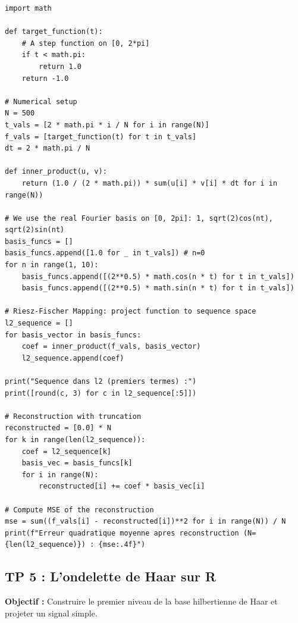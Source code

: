 \documentclass[11pt,a4paper]{article}
\begin{document}
\begin{lstlisting}
import math

def target_function(t):
    # A step function on [0, 2*pi]
    if t < math.pi:
        return 1.0
    return -1.0

# Numerical setup
N = 500
t_vals = [2 * math.pi * i / N for i in range(N)]
f_vals = [target_function(t) for t in t_vals]
dt = 2 * math.pi / N

def inner_product(u, v):
    return (1.0 / (2 * math.pi)) * sum(u[i] * v[i] * dt for i in range(N))

# We use the real Fourier basis on [0, 2pi]: 1, sqrt(2)cos(nt), sqrt(2)sin(nt)
basis_funcs = []
basis_funcs.append([1.0 for _ in t_vals]) # n=0
for n in range(1, 10):
    basis_funcs.append([(2**0.5) * math.cos(n * t) for t in t_vals])
    basis_funcs.append([(2**0.5) * math.sin(n * t) for t in t_vals])

# Riesz-Fischer Mapping: project function to sequence space
l2_sequence = []
for basis_vector in basis_funcs:
    coef = inner_product(f_vals, basis_vector)
    l2_sequence.append(coef)

print("Sequence dans l2 (premiers termes) :")
print([round(c, 3) for c in l2_sequence[:5]])

# Reconstruction with truncation
reconstructed = [0.0] * N
for k in range(len(l2_sequence)):
    coef = l2_sequence[k]
    basis_vec = basis_funcs[k]
    for i in range(N):
        reconstructed[i] += coef * basis_vec[i]

# Compute MSE of the reconstruction
mse = sum((f_vals[i] - reconstructed[i])**2 for i in range(N)) / N
print(f"Erreur quadratique moyenne apres reconstruction (N={len(l2_sequence)}) : {mse:.4f}")
\end{lstlisting}


\subsection*{TP 5 : L'ondelette de Haar sur R}

\textbf{Objectif :} Construire le premier niveau de la base hilbertienne de Haar et projeter un signal simple.
\end{document}
